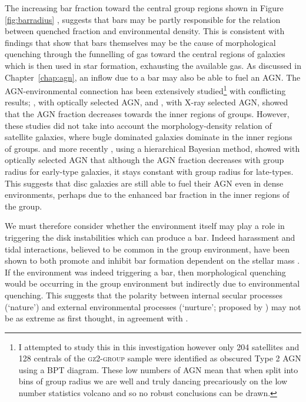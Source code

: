 The increasing bar fraction toward the central group regions  shown in Figure \ref{fig:barradius} \citep[in agreement with][]{skibba12}, suggests that bars may be partly responsible for the relation between quenched fraction and environmental density. This is consistent with findings that show that bars themselves may be the cause of morphological quenching through the funnelling of gas toward the central regions of galaxies \citep{athanassoula92b, sheth05,masters10c} which is then used in star formation, exhausting the available gas. As discussed in Chapter~\ref{chap:agn}, an inflow due to a bar may also be able to fuel an AGN. The AGN-environmental connection has been extensively studied\footnote{I attempted to study this in this investigation however only 204 satellites and 128 centrals of the \textsc{gz2-group} sample were identified as obscured Type 2 AGN using a BPT diagram. These low numbers of AGN mean that when split into bins of group radius we are well and truly dancing precariously on the low number statistics volcano and so no robust conclusions can be drawn.} with conflicting results; \cite{pimbblet13}, with optically selected AGN, and \cite{elhert14}, with X-ray selected AGN, showed that the AGN fraction decreases towards the inner regions of groups. However, these studies did not take into account the morphology-density relation of satellite galaxies, where bugle dominated galaxies dominate in the inner regions of groups. \cite{miller03} and more recently \cite{desouza16}, using a hierarchical Bayesian method, showed with optically selected AGN that although the AGN fraction decreases with group radius for early-type galaxies, it stays constant with group radius for late-types. This suggests that disc galaxies are still able to fuel their AGN even in dense environments, perhaps due to the enhanced bar fraction in the inner regions of the group.

We must therefore consider whether the environment itself may play a role in triggering the disk instabilities which can produce a bar. Indeed harassment and tidal interactions, believed to be common in the group environment, have been shown to both promote and inhibit bar formation dependent on the stellar mass \citep{noguchi88, moore96, skibba12}.  If the environment was indeed triggering a bar, then morphological quenching would be occurring in the group environment but indirectly due to environmental quenching. This suggests that the polarity between internal secular processes (`nature') and external environmental processes (`nurture'; proposed by \citealt{peng10}) may not be as extreme as first thought, in agreement with \cite{skibba12}. 

